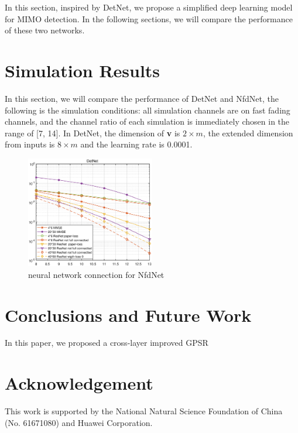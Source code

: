 \documentclass[conference]{IEEEtran}
\begin{document}
In this section, inspired by DetNet, we propose a simplified deep learning model for MIMO detection. In the following sections, we will compare the performance of these two networks.

\section{Simulation Results}

In this section, we will compare the performance of DetNet and NfdNet, the following is the simulation conditions:
all simulation channels are on fast fading channels, and the channel ratio of each simulation is immediately chosen in the range of [7, 14]. In DetNet, the dimension of \textbf{v} is ${2 \times m}$, the extended dimension from inputs is ${8 \times m}$ and the learning rate is 0.0001.
\begin{figure}[ht]
  \centering
  \includegraphics[width=0.5\textwidth]{beforeResult.eps}
  \caption{neural network connection for NfdNet}
  \label{NfdNet1}
\end{figure}


\section{Conclusions and Future Work}
In this paper, we proposed a cross-layer improved GPSR

\section*{Acknowledgement}
This work is supported by the National Natural Science Foundation of China (No. 61671080) and Huawei Corporation.
\end{document}
